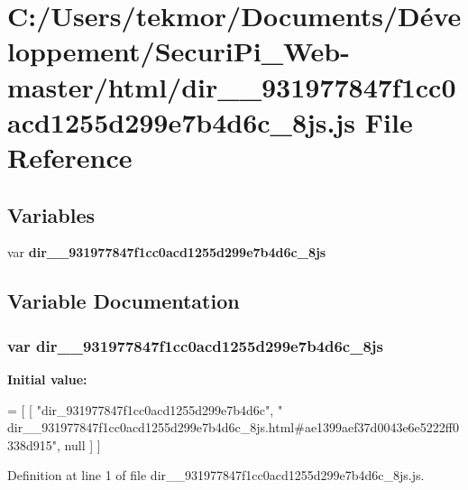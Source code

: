 \section{C\+:/\+Users/tekmor/\+Documents/\+Développement/\+Securi\+Pi\+\_\+\+Web-\/master/html/dir\+\_\+\+\_\+931977847f1cc0acd1255d299e7b4d6c\+\_\+8js.js File Reference}
\label{dir____931977847f1cc0acd1255d299e7b4d6c__8js_8js}
\subsection*{Variables}
\begin{DoxyCompactItemize}
\item 
var {\bf dir\+\_\+\+\_\+931977847f1cc0acd1255d299e7b4d6c\+\_\+8js}
\end{DoxyCompactItemize}


\subsection{Variable Documentation}
\subsubsection[{dir\+\_\+\+\_\+931977847f1cc0acd1255d299e7b4d6c\+\_\+8js}]{\setlength{\rightskip}{0pt plus 5cm}var dir\+\_\+\+\_\+931977847f1cc0acd1255d299e7b4d6c\+\_\+8js}\label{dir____931977847f1cc0acd1255d299e7b4d6c__8js_8js_aa2bf0eba7ef70faa2406833d7d11f7e1}
{\bfseries Initial value\+:}
\begin{DoxyCode}
=
[
    [ \textcolor{stringliteral}{"dir\_931977847f1cc0acd1255d299e7b4d6c"}, \textcolor{stringliteral}{"
      dir\_\_931977847f1cc0acd1255d299e7b4d6c\_8js.html#ae1399aef37d0043e6e5222ff0338d915"}, null ]
]
\end{DoxyCode}


Definition at line 1 of file dir\+\_\+\+\_\+931977847f1cc0acd1255d299e7b4d6c\+\_\+8js.\+js.

